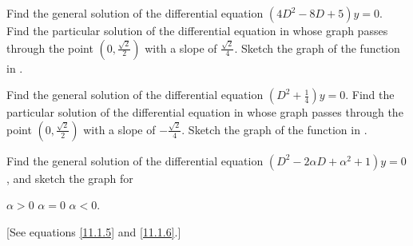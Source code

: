 \begin{exercises}
\begin{exenum}
\x
{}
Find the general solution of the differential equation
$(4D^2-8D+5)y = 0$.
\x
{}
Find the particular solution of the differential equation in
 whose graph passes through the point
$\left(0, \frac{\sqrt2}2\right)$ with a slope of $\frac{\sqrt2}4$.
\x
Sketch the graph of the function in .
\end{exenum}

\begin{exenum}
\x
{}
Find the general solution of the differential equation
$(D^2+\frac14)y = 0$.
\x
{}
Find the particular solution of the differential equation in
 whose graph passes through the point
$\left(0, \frac{\sqrt2}2\right)$ with a slope of $-\frac{\sqrt2}4$.
\x
Sketch the graph of the function in .
\end{exenum}

Find the general solution of the differential equation
$(D^2-2\alpha D +\alpha^2 + 1)y=0$,
and sketch the graph for
\begin{exenum}
\x
$\alpha > 0$
\x
$\alpha = 0$
\x
$\alpha < 0$.
\end{exenum}
[See equations \eqref{11.1.5} and \eqref{11.1.6}.]

\end{exercises}

